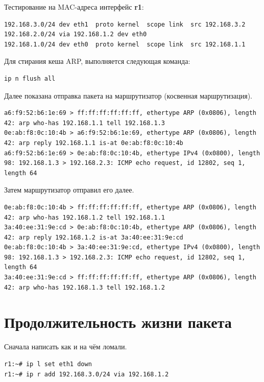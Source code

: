 \documentclass[a4paper,12pt]{article}
\begin{document}

Тестирование на MAC-адреса интерфейс \textbf{r1}:

\begin{Verbatim}
192.168.3.0/24 dev eth1  proto kernel  scope link  src 192.168.3.2 
192.168.2.0/24 via 192.168.1.2 dev eth0 
192.168.1.0/24 dev eth0  proto kernel  scope link  src 192.168.1.1 
\end{Verbatim}

Для стирания кеша ARP, выполняется следующая команда: 
\begin{Verbatim}
ip n flush all
\end{Verbatim}

Далее показана отправка пакета на маршрутизатор (косвенная маршрутизация). 

\begin{Verbatim}
a6:f9:52:b6:1e:69 > ff:ff:ff:ff:ff:ff, ethertype ARP (0x0806), length 42: arp who-has 192.168.1.1 tell 192.168.1.3
0e:ab:f8:0c:10:4b > a6:f9:52:b6:1e:69, ethertype ARP (0x0806), length 42: arp reply 192.168.1.1 is-at 0e:ab:f8:0c:10:4b
a6:f9:52:b6:1e:69 > 0e:ab:f8:0c:10:4b, ethertype IPv4 (0x0800), length 98: 192.168.1.3 > 192.168.2.3: ICMP echo request, id 12802, seq 1, length 64
\end{Verbatim}

Затем маршрутизатор отправил его далее.

\begin{Verbatim}
0e:ab:f8:0c:10:4b > ff:ff:ff:ff:ff:ff, ethertype ARP (0x0806), length 42: arp who-has 192.168.1.2 tell 192.168.1.1
3a:40:ee:31:9e:cd > 0e:ab:f8:0c:10:4b, ethertype ARP (0x0806), length 42: arp reply 192.168.1.2 is-at 3a:40:ee:31:9e:cd
0e:ab:f8:0c:10:4b > 3a:40:ee:31:9e:cd, ethertype IPv4 (0x0800), length 98: 192.168.1.3 > 192.168.2.3: ICMP echo request, id 12802, seq 1, length 64
3a:40:ee:31:9e:cd > ff:ff:ff:ff:ff:ff, ethertype ARP (0x0806), length 42: arp who-has 192.168.1.3 tell 192.168.1.2
\end{Verbatim}

\section{Продолжительность жизни пакета}

Сначала написать как и на чём ломали. 

\begin{Verbatim}
r1:~# ip l set eth1 down
r1:~# ip r add 192.168.3.0/24 via 192.168.1.2
\end{Verbatim}
\end{document}

